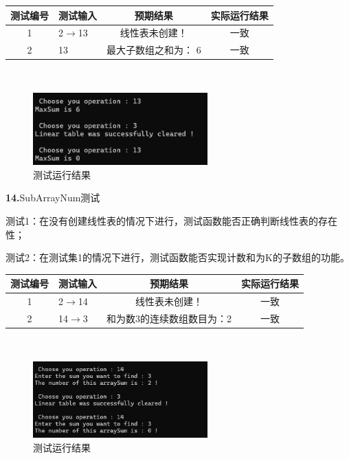 \documentclass[supercite]{Experimental_Report}
\theoremstyle{definition}
\begin{document}
\vspace{0.5em}

\begin{tabular}{|c|p{2.7cm}|c|c|}
	\hline
	测试编号 & 测试输入 & 预期结果 & 实际运行结果 \\
	\hline
	1 & 2$\rightarrow$13 & 线性表未创建！ & 一致 \\
	\hline
	2 & 13 & 最大子数组之和为： 6& 一致 \\
	\hline
\end{tabular}

~\

 \begin{figure}[H]
 	\centering
 	\includegraphics[width=0.6\textwidth]{images/线性表测试13.png}
 	\caption{测试运行结果}
 	\label{txlab}
 \end{figure}


\noindent\textbf{14.}SubArrayNum测试
	
测试1：在没有创建线性表的情况下进行，测试函数能否正确判断线性表的存在性；

测试2：在测试集1的情况下进行，测试函数能否实现计数和为K的子数组的功能。

\vspace{0.5em}

\begin{tabular}{|c|p{2.7cm}|c|c|}
	\hline
	测试编号 & 测试输入 & 预期结果 & 实际运行结果 \\
	\hline
	1 & 2$\rightarrow$14 & 线性表未创建！ & 一致 \\
	\hline
	2 & 14$\rightarrow$3 & 和为数3的连续数组数目为：2 & 一致 \\
	\hline
\end{tabular}

~\

 \begin{figure}[H]
 	\centering
 	\includegraphics[width=0.6\textwidth]{images/线性表测试14.png}
 	\caption{测试运行结果}
 	\label{txlab}
 \end{figure}
\end{document}
